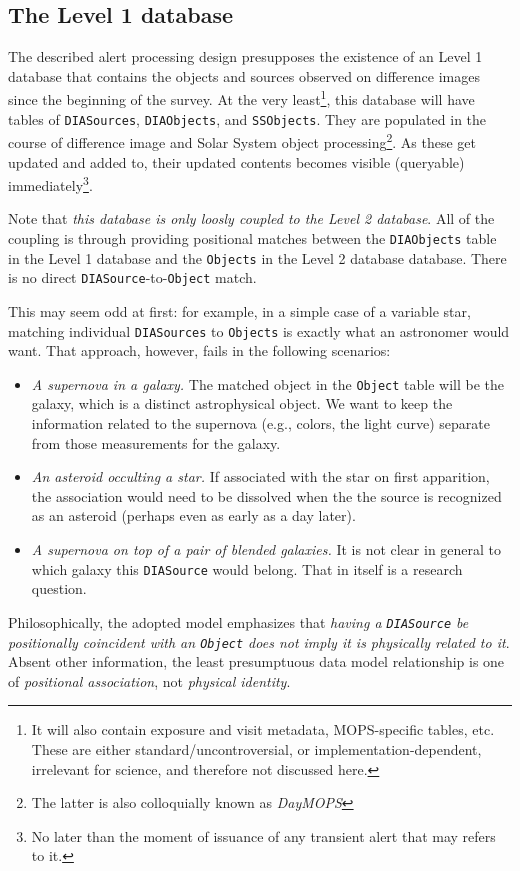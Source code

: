 \documentclass[12pt]{article}
\newcommand{\code}[1]{\texttt{#1}}
\newcommand{\DIASource}{\code{DIASource}\xspace}
\newcommand{\DIASources}{\code{DIASources}\xspace}
\newcommand{\DIAObjects}{\code{DIAObjects}\xspace}
\newcommand{\DB}{{Level 1 database}\xspace}
\newcommand{\DR}{{Level 2 database}\xspace}
\newcommand{\Object}{\code{Object}\xspace}
\newcommand{\Objects}{\code{Objects}\xspace}
\newcommand{\SSObjects}{\code{SSObjects}\xspace}
\begin{document}
\subsection{The \DB}
\label{sec:level1db}

The described alert processing design presupposes the existence of an \DB that contains the objects and sources observed on difference images since the beginning of the survey. At the very least\footnote{It will also contain exposure and visit metadata, MOPS-specific tables, etc. These are either standard/uncontroversial, or implementation-dependent, irrelevant for science, and therefore not discussed here.}, this database will have tables of \DIASources, \DIAObjects, and \SSObjects. They are populated in the course of difference image and Solar System object processing\footnote{The latter is also colloquially known as {\em DayMOPS}}. As these get updated and added to, their updated contents becomes visible (queryable) immediately\footnote{No later than the moment of issuance of any transient alert that may refers to it.}.

Note that {\em this database is only loosly coupled to the \DR}. All of the coupling is through providing positional matches between the \DIAObjects table in the \DB and the \Objects in the \DR database. There is no direct \DIASource-to-\Object match.

This may seem odd at first: for example, in a simple case of a variable star, matching individual \DIASources to \Objects is exactly what an astronomer would want. That approach, however, fails in the following scenarios:
\begin{itemize}
\item {\em A supernova in a galaxy.} The matched object in the \Object table will be the galaxy, which is a distinct astrophysical object. We want to keep the information related to the supernova (e.g., colors, the light curve) separate from those measurements for the galaxy.
\item {\em An asteroid occulting a star.} If associated with the star on first apparition, the association would need to be dissolved when the the source is recognized as an asteroid (perhaps even as early as a day later).
\item {\em A supernova on top of a pair of blended galaxies.} It is not clear in general to which galaxy this \DIASource would belong. That in itself is a research question.
\end{itemize}

Philosophically, the adopted model emphasizes that {\em having a \DIASource be positionally coincident with an \Object does not imply it is physically related to it}. Absent other information, the least presumptuous data model relationship is one of {\em positional association}, not {\em physical identity}.
\end{document}
